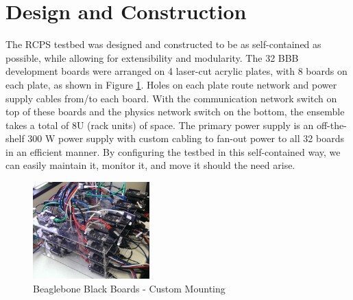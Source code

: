 \section{Design and Construction}
\label{sec:Construction}

The RCPS testbed was designed and constructed to be as self-contained as possible, while allowing for extensibility and modularity. The 32 BBB development boards were arranged on 4 laser-cut acrylic plates, with 8 boards on each plate, as shown in Figure \ref{fig:boards}. Holes on each plate route network and power supply cables from/to each board. With the communication network switch on top of these boards and the physics network switch on the bottom, the ensemble takes a total of 8U (rack units) of space. The primary power supply is an off-the-shelf 300 W power supply with custom cabling to fan-out power to all 32 boards in an efficient manner.  By configuring the testbed in this self-contained way, we can easily maintain it, monitor it, and move it should the need arise.  

\begin{figure}[h]
	\centering
	\includegraphics[width=0.40\textwidth]{figs/bbb.jpg}
	\caption{Beaglebone Black Boards - Custom Mounting}
	\label{fig:boards}
\end{figure}

